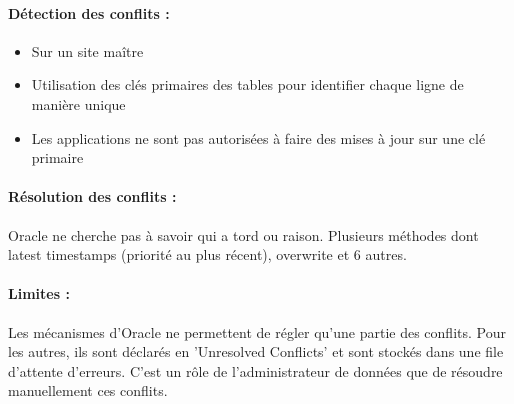 \documentclass[10pt,a4paper,twoside]{article}
\begin{document}
\paragraph{Détection des conflits :}
\begin{itemize}
\item Sur un site maître
\item Utilisation des clés primaires des tables pour identifier chaque ligne de manière unique
\item Les applications ne sont pas autorisées à faire des mises à jour sur une clé primaire
\end{itemize}

\paragraph{Résolution des conflits :} Oracle ne cherche pas à savoir qui a tord ou raison. Plusieurs méthodes dont latest timestamps (priorité au plus récent), overwrite et 6 autres.

\paragraph{Limites :} Les mécanismes d'Oracle ne permettent de régler qu'une partie des conflits. Pour les autres, ils sont déclarés en 'Unresolved Conflicts' et sont stockés dans une file d'attente d'erreurs. C'est un rôle de l'administrateur de données que de résoudre manuellement ces conflits.
\end{document}
